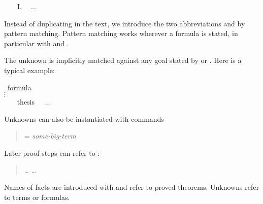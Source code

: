 \begin{isabellebody}
\ \ \isamarkupfalse%
\ {}{}L{}\ %
\ $\dots$\\
\isamarkupfalse%
%
\endisatagproof
{\isafoldproof}%
%
\isadelimproof
%
\endisadelimproof
%
\begin{isamarkuptext}%
Instead of duplicating  in the text, we introduce
the two abbreviations  and  by pattern matching.
Pattern matching works wherever a formula is stated, in particular
with  and .

The unknown  is implicitly matched against any goal stated by
 or . Here is a typical example:%
\end{isamarkuptext}%
\isamarkuptrue%
\isamarkupfalse%
\ {}formula{}\isanewline
%
\isadelimproof
%
\endisadelimproof
%
\isatagproof
{}\isamarkupfalse%
\ {}%
\\\mbox{}\quad$\vdots$\\\mbox{}\hspace{-1.4ex}
\ \ \isamarkupfalse%
\ {}thesis\ %
\ $\dots$\\
\isamarkupfalse%
%
\endisatagproof
{\isafoldproof}%
%
\isadelimproof
%
\endisadelimproof
%
\begin{isamarkuptext}%
Unknowns can also be instantiated with  commands
\begin{quote}
  = \textit{some-big-term}
\end{quote}
Later proof steps can refer to :
\begin{quote}
 \dots {} \dots{}
\end{quote}
\begin{warn}
Names of facts are introduced with  and refer to proved
theorems. Unknowns  refer to terms or formulas.
\end{warn}


\end{isamarkuptext}
\end{isabellebody}
